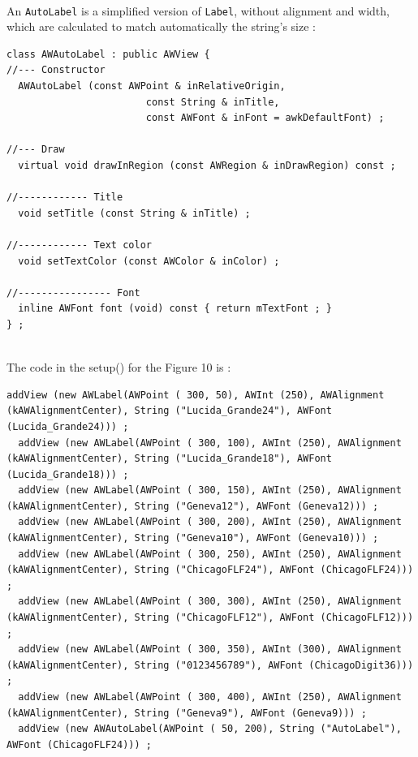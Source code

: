 \documentclass[a4paper,11pt]{extarticle}
\begin{document}
~\\ An \texttt{AutoLabel} is a simplified version of \texttt{Label}, without alignment and width, which are calculated to match automatically the string's size :

\begin{lstlisting}[language=Arduinonl]
class AWAutoLabel : public AWView {
//--- Constructor
  AWAutoLabel (const AWPoint & inRelativeOrigin,
                        const String & inTitle,
                        const AWFont & inFont = awkDefaultFont) ;

//--- Draw
  virtual void drawInRegion (const AWRegion & inDrawRegion) const ;

//------------ Title
  void setTitle (const String & inTitle) ;

//------------ Text color
  void setTextColor (const AWColor & inColor) ;

//---------------- Font
  inline AWFont font (void) const { return mTextFont ; }
} ;
\end{lstlisting}

~\\ The code in the setup() for the Figure 10 is :

\begin{lstlisting}[language=Arduinonl]
  addView (new AWLabel(AWPoint ( 300, 50), AWInt (250), AWAlignment (kAWAlignmentCenter), String ("Lucida_Grande24"), AWFont (Lucida_Grande24))) ;
  addView (new AWLabel(AWPoint ( 300, 100), AWInt (250), AWAlignment (kAWAlignmentCenter), String ("Lucida_Grande18"), AWFont (Lucida_Grande18))) ;
  addView (new AWLabel(AWPoint ( 300, 150), AWInt (250), AWAlignment (kAWAlignmentCenter), String ("Geneva12"), AWFont (Geneva12))) ;
  addView (new AWLabel(AWPoint ( 300, 200), AWInt (250), AWAlignment (kAWAlignmentCenter), String ("Geneva10"), AWFont (Geneva10))) ;
  addView (new AWLabel(AWPoint ( 300, 250), AWInt (250), AWAlignment (kAWAlignmentCenter), String ("ChicagoFLF24"), AWFont (ChicagoFLF24))) ;
  addView (new AWLabel(AWPoint ( 300, 300), AWInt (250), AWAlignment (kAWAlignmentCenter), String ("ChicagoFLF12"), AWFont (ChicagoFLF12))) ;
  addView (new AWLabel(AWPoint ( 300, 350), AWInt (300), AWAlignment (kAWAlignmentCenter), String ("0123456789"), AWFont (ChicagoDigit36))) ;
  addView (new AWLabel(AWPoint ( 300, 400), AWInt (250), AWAlignment (kAWAlignmentCenter), String ("Geneva9"), AWFont (Geneva9))) ;
  addView (new AWAutoLabel(AWPoint ( 50, 200), String ("AutoLabel"), AWFont (ChicagoFLF24))) ;
\end{lstlisting}
\end{document}

